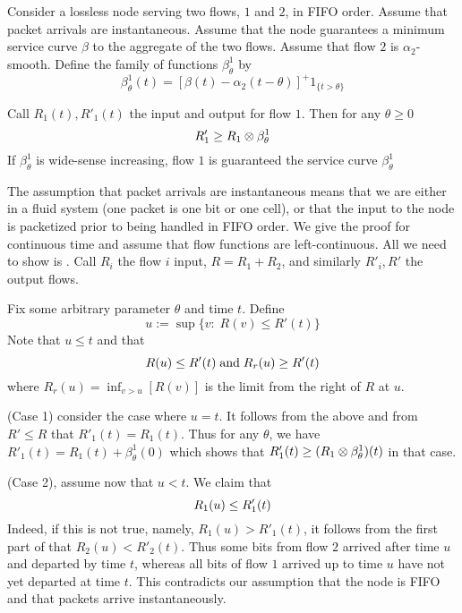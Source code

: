 \begin{proposition}
Consider a lossless node serving two flows, $1$ and $2$, in FIFO
order. Assume that packet arrivals are instantaneous. Assume that
the node guarantees a minimum service curve $\beta$ to the
aggregate of the two flows. Assume that flow $2$ is
$\alpha_2$-smooth. Define the family of functions
$\beta^1_{\theta}$ by
$$
\beta^1_{\theta}(t)=[\beta(t) - \alpha_2(t-\theta)]^+ 1_{\{t >
\theta\}}$$

Call $R_1(t), R'_1(t)$ the input and output for flow $1$. Then for
any $\theta \geq 0$
\begin{equation}\mylabel{eq-fifomux0}
 R'_1 \geq R_1 \mpc \beta^1_{\theta}
\end{equation}
If $\beta^1_{\theta}$ is wide-sense increasing, flow $1$ is
guaranteed the service curve $\beta^1_{\theta}$
\end{proposition}
The assumption that packet arrivals are instantaneous means that
we are either in a fluid system (one packet is one bit or one
cell), or that the input to the node is packetized prior to being
handled in FIFO order.
 \pr
 We give the proof for continuous time and assume that flow
functions are left-continuous. All we need to show is
. Call $R_i$ the flow $i$ input, $R=R_1 + R_2$,
and similarly $R'_i, R'$ the output flows.

Fix some arbitrary parameter $\theta$ and time $t$. Define
$$u:= \sup\{v : \; R(v) \leq R'(t)\}$$
Note that $u \leq t$ and that
\begin{equation}\mylabel{eq-fifosc1}
 R(u) \leq R'(t) \mand R_r(u) \geq R'(t)
\end{equation}
where $R_r(u)=\inf_{v >u}[R(v)]$ is the limit from the right of $R$
at $u$.

(Case 1) consider the case where $u=t$. It follows from the above
and from $R' \leq R$ that $R'_1(t)=R_1(t)$. Thus for any $\theta$,
we have $R'_1(t) = R_1(t) + \beta^1_{\theta}(0)$ which shows that
$R'_1(t) \geq (R_1 \otimes \beta^1_{\theta})(t)$ in that case.

(Case 2), assume now that $u< t$. We claim that
\begin{equation}\mylabel{eq-fifosc2}
  R_1(u) \leq R'_1(t)
\end{equation}
Indeed, if this is not true, namely, $R_1(u) > R'_1(t)$, it
follows from the first part of  that $R_2(u)
<R'_2(t)$. Thus some bits from flow $2$ arrived after time $u$ and
departed by time $t$, whereas all bits of flow $1$ arrived up to
time $u$ have not yet departed at time $t$. This contradicts our
assumption that the node is FIFO and that packets arrive
instantaneously.

